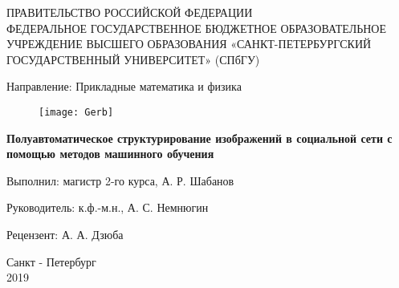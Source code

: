 \begin{titlepage}
		
\thispagestyle{empty}
		
  \begin{center}
  
   
   ПРАВИТЕЛЬСТВО РОССИЙСКОЙ ФЕДЕРАЦИИ \\
   
   \vspace{0.25cm}
   ФЕДЕРАЛЬНОЕ ГОСУДАРСТВЕННОЕ БЮДЖЕТНОЕ
   ОБРАЗОВАТЕЛЬНОЕ УЧРЕЖДЕНИЕ ВЫСШЕГО ОБРАЗОВАНИЯ 
   «САНКТ-ПЕТЕРБУРГСКИЙ ГОСУДАРСТВЕННЫЙ УНИВЕРСИТЕТ» 
   (СПбГУ)
   
   \vspace{0.25cm}
   Направление: Прикладные математика и физика
   
 
   \begin{figure}[h!]
   	\begin{center}
   		\texttt{[image: Gerb]}
   	\end{center}
   \end{figure}


     \textbf{\Large Полуавтоматическое структурирование
     изображений в социальной сети с помощью 
     методов машинного обучения}
     
 \bigskip

\vfill

\begin{flushright}
    Выполнил: магистр 2-го курса, А. Р. Шабанов
    
    Руководитель: к.ф.-м.н., А. С. Немнюгин
    
    Рецензент: А. А. Дзюба
\end{flushright}

\end{center}

\vfill

\newlength{\ML}


\begin{center}
    Санкт - Петербург \\
    2019
\end{center}

\end{titlepage}
